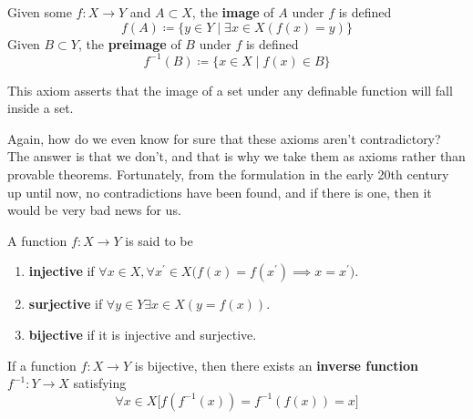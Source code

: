   \begin{definition}
    Given some $f: X \rightarrow Y$ and $A \subset X$, the \textbf{image} of $A$ under $f$ is defined 
    \begin{equation}
      f(A) \coloneqq \{y \in Y \mid \exists x \in X (f(x) = y)\}
    \end{equation}
    Given $B \subset Y$, the \textbf{preimage} of $B$ under $f$ is defined 
    \begin{equation}
      f^{-1} (B) \coloneqq \{ x \in X \mid f(x) \in B \}
    \end{equation}
  \end{definition} 

  \begin{axiom}
    This axiom asserts that the image of a set under any definable function will fall inside a set. 
  \end{axiom} 

  Again, how do we even know for sure that these axioms aren't contradictory? The answer is that we don't, and that is why we take them as axioms rather than provable theorems. Fortunately, from the formulation in the early 20th century up until now, no contradictions have been found, and if there is one, then it would be very bad news for us.  

  \begin{definition}
    A function $f: X \rightarrow Y$ is said to be 
    \begin{enumerate}
      \item \textbf{injective} if $\forall x \in X, \forall x^\prime \in X \big( f(x) = f(x^\prime) \implies x = x^\prime \big)$. 
      \item \textbf{surjective} if $\forall y \in Y \exists x \in X (y = f(x))$. 
      \item \textbf{bijective} if it is injective and surjective. 
    \end{enumerate}
  \end{definition}

  \begin{definition}
    If a function $f: X \rightarrow Y$ is bijective, then there exists an \textbf{inverse function} $f^{-1}: Y \rightarrow X$ satisfying 
    \begin{equation}
      \forall x \in X \big[ f(f^{-1}(x)) = f^{-1} (f(x)) = x \big]
    \end{equation}
  \end{definition} 

